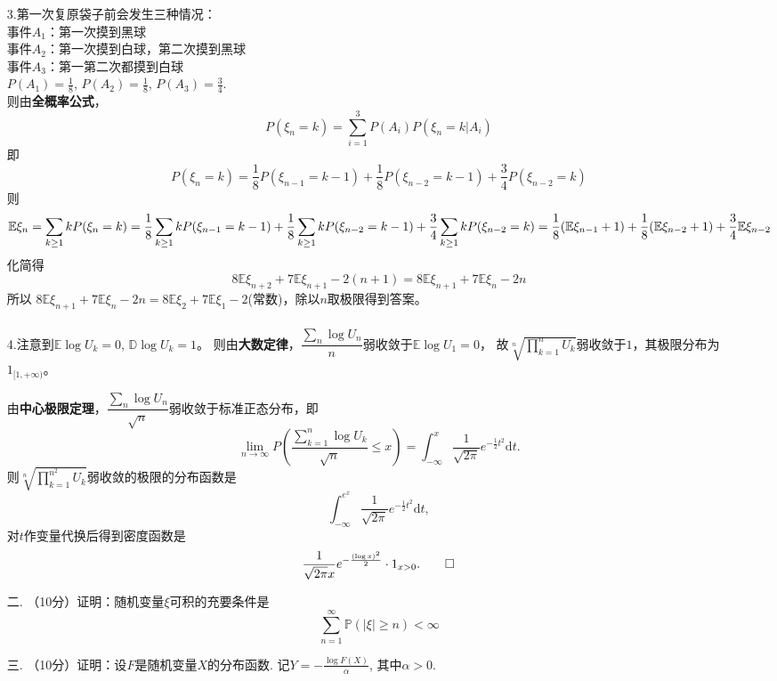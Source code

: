 \begin{itemize}
\begin{proofc}[解答]
        3.第一次复原袋子前会发生三种情况：\\
        事件$A_1$：第一次摸到黑球\\
        事件$A_2$：第一次摸到白球，第二次摸到黑球\\
        事件$A_3$：第一第二次都摸到白球\\
        $P(A_1)=\frac{1}{8}$, $P(A_2)=\frac{1}{8}$, $P(A_3)=\frac{3}{4}$.\\
        则由\textbf{全概率公式}，\[P(\xi_{n}=k)=\sum_{i=1}^3 P(A_i)P(\xi_{n}=k|A_i)\]
        即\[P(\xi_{n}=k)=\frac{1}{8}P(\xi_{n-1}=k-1)+\frac{1}{8}P(\xi_{n-2}=k-1)+\frac{3}{4}P(\xi_{n-2}=k)\]
        则\[\mathbb{E}\xi_n=\sum_{k\ge1}kP(\xi_{n}=k)\\
        =\frac{1}{8}\sum_{k\ge1}kP(\xi_{n-1}=k-1)+\frac{1}{8}\sum_{k\ge1}kP(\xi_{n-2}=k-1)+\frac{3}{4}\sum_{k\ge1}kP(\xi_{n-2}=k)\\
        =\frac{1}{8}(\mathbb{E}\xi_{n-1}+1)+\frac{1}{8}(\mathbb{E}\xi_{n-2}+1)+\frac{3}{4}\mathbb{E}\xi_{n-2}\]
        化简得\[8\mathbb{E}\xi_{n+2}+7\mathbb{E}\xi_{n+1}-2(n+1)=8\mathbb{E}\xi_{n+1}+7\mathbb{E}\xi_{n}-2n\] 所以
        $8\mathbb{E}\xi_{n+1}+7\mathbb{E}\xi_{n}-2n=8\mathbb{E}\xi_{2}+7\mathbb{E}\xi_{1}-2$(常数)，除以$n$取极限得到答案。\\
        \\
        4.注意到$\mathbb{E}\log{U_k}=0$, $\mathbb{D}\log{U_k}=1$。
        则由\textbf{大数定律}，$\dfrac{\sum_{n} {\log{U_n}}}{n}$弱收敛于$\mathbb{E}\log{U_1}=0$，
        故$\sqrt[n]{\prod\limits_{k=1}^{n}U_k}$弱收敛于$1$，其极限分布为$1_{[1,+\infty)}$。

        由\textbf{中心极限定理}，$\dfrac{\sum_{n} {\log{U_n}}}{\sqrt{n}}$弱收敛于标准正态分布，即
        \[\lim_{n \to \infty}P(\frac{\sum_{k=1}^n \log{U_k}}{\sqrt{n}}\le{x})
        =\int_{-\infty}^{x}\frac{1}{\sqrt{2\pi}}e^{-\frac{1}{2}t^2}\mathrm{d}t.\]
        则$\sqrt[n]{\prod\limits_{k=1}^{n^2}U_k}$弱收敛的极限的分布函数是
        \[\int_{-\infty}^{e^x}\frac{1}{\sqrt{2\pi}}e^{-\frac{1}{2}t^2}\mathrm{d}t,\]
        对$t$作变量代换后得到密度函数是
        \[\frac{1}{\sqrt{2\pi}x}e^{-\frac{(\log{x})^2}{2}}\cdot1_{x>0}.\qedhere\]
    \end{proofc}
    \item[二.]（10分）证明：随机变量$\xi$可积的充要条件是
    $$\sum_{n=1}^{\infty}\mathbb{P}(|\xi|\geq n)<\infty$$
    
    \item[三.]（10分）证明：设$F$是随机变量$X$的分布函数.
    记$Y=-\frac{\log{F(X)}}{\alpha}$, 其中$\alpha>0$. 
    

\end{itemize}
